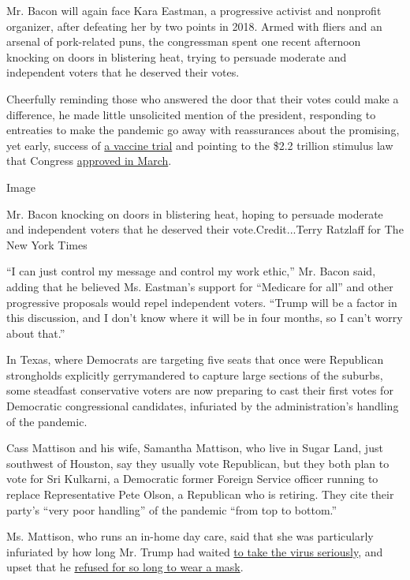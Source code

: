 Mr. Bacon will again face Kara Eastman, a progressive activist and
nonprofit organizer, after defeating her by two points in 2018. Armed
with fliers and an arsenal of pork-related puns, the congressman spent
one recent afternoon knocking on doors in blistering heat, trying to
persuade moderate and independent voters that he deserved their votes.

Cheerfully reminding those who answered the door that their votes could
make a difference, he made little unsolicited mention of the president,
responding to entreaties to make the pandemic go away with reassurances
about the promising, yet early, success of
\href{https://www.nytimes.com/2020/07/14/health/cornavirus-vaccine-moderna.html}{a
vaccine trial} and pointing to the \$2.2 trillion stimulus law that
Congress
\href{https://www.nytimes.com/2020/03/27/us/politics/coronavirus-house-voting.html}{approved
in March}.

Image

Mr. Bacon knocking on doors in blistering heat, hoping to persuade
moderate and independent voters that he deserved their
vote.Credit...Terry Ratzlaff for The New York Times

``I can just control my message and control my work ethic,'' Mr. Bacon
said, adding that he believed Ms. Eastman's support for ``Medicare for
all'' and other progressive proposals would repel independent voters.
``Trump will be a factor in this discussion, and I don't know where it
will be in four months, so I can't worry about that.''

In Texas, where Democrats are targeting five seats that once were
Republican strongholds explicitly gerrymandered to capture large
sections of the suburbs, some steadfast conservative voters are now
preparing to cast their first votes for Democratic congressional
candidates, infuriated by the administration's handling of the pandemic.

Cass Mattison and his wife, Samantha Mattison, who live in Sugar Land,
just southwest of Houston, say they usually vote Republican, but they
both plan to vote for Sri Kulkarni, a Democratic former Foreign Service
officer running to replace Representative Pete Olson, a Republican who
is retiring. They cite their party's ``very poor handling'' of the
pandemic ``from top to bottom.''

Ms. Mattison, who runs an in-home day care, said that she was
particularly infuriated by how long Mr. Trump had waited
\href{https://www.nytimes.com/interactive/2020/us/texas-coronavirus-cases.html}{to
take the virus seriously}, and upset that he
\href{https://www.nytimes.com/2020/07/01/us/coronavirus-masks.html}{refused
for so long to wear a mask}.

